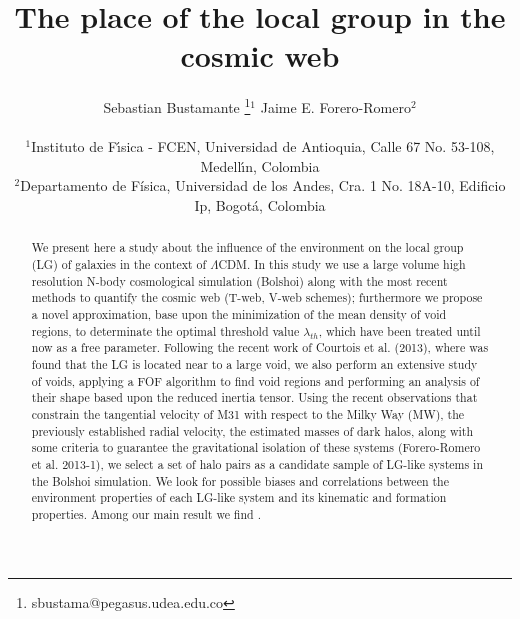 \documentclass[a4,useAMS,usenatbib,usegraphicx]{latex/mn2e}
\begin{document}
\title{The place of the local group in the cosmic web}
\author[S. Bustamante and J.E. Forero-Romero]{
\parbox[t]{\textwidth}{\raggedright 
  Sebastian Bustamante \thanks{sbustama@pegasus.udea.edu.co}$^{1}$ 
  Jaime E. Forero-Romero$^{2}$ 
}
\vspace*{6pt}\\
$^1$Instituto de F\'{\i}sica - FCEN, Universidad de Antioquia, Calle
67 No. 53-108, Medell\'{\i}n, Colombia\\ 
$^2$Departamento de F\'{i}sica, Universidad de los Andes, Cra. 1
No. 18A-10, Edificio Ip, Bogot\'a, Colombia
}

\maketitle

\begin{abstract}


We present here a study about the influence of the environment on the
local group (LG) of galaxies in the context of $\Lambda$CDM. In this study 
we use a large volume high resolution N-body cosmological simulation 
(Bolshoi) along with the most recent methods to quantify the cosmic web 
(T-web, V-web schemes); furthermore we propose a novel approximation, base
upon the minimization of the mean density of void regions, to determinate 
the optimal threshold value $\lambda_{th}$, which have been treated until 
now as a free parameter. 
Following the recent work of Courtois et al. (2013), where was 
found that the LG is located near to a large void, we also perform an 
extensive study of voids, applying a FOF algorithm to find void regions 
and performing an analysis of their shape based upon the reduced inertia 
tensor.
Using the recent observations that constrain the tangential velocity of
M31 with respect to the Milky Way (MW), the previously established radial 
velocity, the estimated masses of dark halos, along with some criteria
to guarantee the gravitational isolation of these systems (Forero-Romero
et al. 2013-1), we select a set of halo pairs as a candidate sample 
of LG-like systems in the Bolshoi simulation. 
We look for possible biases and correlations between the environment 
properties of each LG-like system and its kinematic and formation 
properties. Among our main result we find .

\end{abstract}
\end{document}

